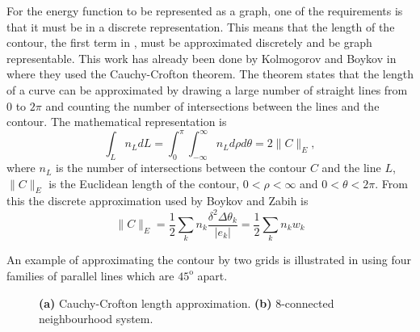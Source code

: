 \begin{definition}
	For the energy function to be represented as a graph, one of the requirements is that it must be in a discrete representation. This means that the length of the contour, the first term in , must be approximated discretely and be graph representable. This work has already been done by Kolmogorov and Boykov in \citep{Kolmogorov2005_2,Boykov2003} where they used the Cauchy-Crofton theorem. The theorem states that the length of a curve can be approximated by drawing a large number of straight lines from $0$ to $2\pi$ and counting the number of intersections between the lines and the contour. The mathematical representation is
	\begin{equation}
		\int_L n_L dL = \int_{0}^{\pi}\int_{-\infty}^{\infty} n_L d\rho d\theta = 2 \lVert C \rVert_E,
	\end{equation}
	where $n_L$ is the number of intersections between the contour $C$ and the line $L$, $ \lVert C \rVert_E$ is the Euclidean length of the contour, $0 < \rho < \infty$ and $0 < \theta < 2\pi$. From this the discrete approximation used by Boykov and Zabih is 
	\begin{equation}
		\lVert C \rVert_E = \frac{1}{2}\sum_k n_k \frac{\delta^2 \Delta\theta_k}{|e_k|} = \frac{1}{2}\sum_k n_k w_k
		\label{eq:discretelength}
	\end{equation}
\end{definition}
An example of approximating the contour by two grids is illustrated in  using four families of parallel lines which are $45^\text{o}$ apart.

\begin{figure}[!t]
	\centering
	\caption{\textbf{(a)} Cauchy-Crofton length approximation. \textbf{(b)} 8-connected neighbourhood system.}
	\label{fig:chanveseN8}
\end{figure}

